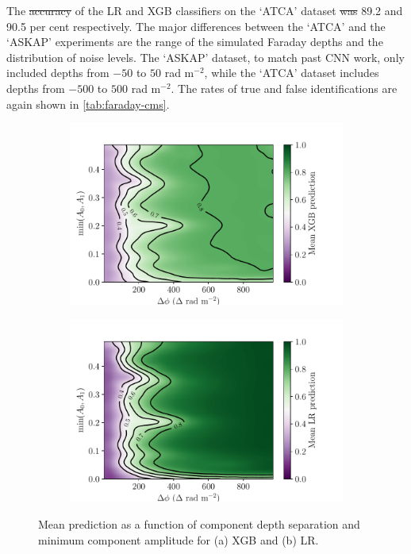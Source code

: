 \documentclass[11pt, a4paper]{book}
\providecommand{\DIFaddtex}[1]{{\protect\color{blue}\uwave{#1}}} %
\providecommand{\DIFdeltex}[1]{{\protect\color{red}\sout{#1}}}                      %
\providecommand{\DIFaddbegin}{} %
\providecommand{\DIFaddend}{} %
\providecommand{\DIFdelbegin}{} %
\providecommand{\DIFdelend}{} %
\providecommand{\DIFadd}[1]{\texorpdfstring{\DIFaddtex{#1}}{#1}} %
\providecommand{\DIFdel}[1]{\texorpdfstring{\DIFdeltex{#1}}{}} %
\newcommand{\DIFscaledelfig}{0.5}
\newlength{\DIFdelgraphicswidth} %
\newlength{\DIFdelgraphicsheight} %
\newcommand{\DIFaddincludegraphics}[2][]{{\color{blue}\fbox{\DIFOincludegraphics[#1]{#2}}}} %
\newcommand{\DIFdelincludegraphics}[2][]{%
\sbox{\DIFdelgraphicsbox}{\DIFOincludegraphics[#1]{#2}}%
\settoboxwidth{\DIFdelgraphicswidth}{\DIFdelgraphicsbox} %
\settoboxtotalheight{\DIFdelgraphicsheight}{\DIFdelgraphicsbox} %
\scalebox{\DIFscaledelfig}{%
\parbox[b]{\DIFdelgraphicswidth}{\usebox{\DIFdelgraphicsbox}\\[-\baselineskip] \rule{\DIFdelgraphicswidth}{0em}}\llap{\resizebox{\DIFdelgraphicswidth}{\DIFdelgraphicsheight}{%
\setlength{\unitlength}{\DIFdelgraphicswidth}%
\begin{picture}(1,1)%
\thicklines\linethickness{2pt} %
{\color[rgb]{1,0,0}\put(0,0){\framebox(1,1){}}}%
{\color[rgb]{1,0,0}\put(0,0){\line( 1,1){1}}}%
{\color[rgb]{1,0,0}\put(0,1){\line(1,-1){1}}}%
\end{picture}%
}\hspace*{3pt}}} %
} %
\DeclareRobustCommand{\DIFaddbegin}{\DIFOaddbegin \let\includegraphics\DIFaddincludegraphics} %
\DeclareRobustCommand{\DIFaddend}{\DIFOaddend \let\includegraphics\DIFOincludegraphics} %
\DeclareRobustCommand{\DIFdelbegin}{\DIFOdelbegin \let\includegraphics\DIFdelincludegraphics} %
\DeclareRobustCommand{\DIFdelend}{\DIFOaddend \let\includegraphics\DIFOincludegraphics} %
\begin{document}
    The \DIFdelbegin \DIFdel{accuracy }\DIFdelend \DIFaddbegin \DIFadd{accuracies }\DIFaddend of the LR and XGB classifiers on the `ATCA' dataset \DIFdelbegin \DIFdel{was }\DIFdelend \DIFaddbegin \DIFadd{were }\DIFaddend 89.2 and 90.5 per cent respectively. The major differences between the `ATCA' and the `ASKAP' experiments are the range of the simulated Faraday depths and the distribution of noise levels. The `ASKAP' dataset, to match past CNN work, only included depths from $-50$ to $50$ rad m$^{-2}$, while the `ATCA' dataset includes depths from $-500$ to $500$ rad m$^{-2}$. The rates of true and false identifications are again shown in \autoref{tab:faraday-cms}.

    \begin{figure}
      \begin{subfigure}{\linewidth}
        \includegraphics[width=\linewidth]{faraday-images/mean_xgb_prediction_dphi_amp.pdf}
        \caption{\label{fig:faraday-mean-xgb-pred}}
      \end{subfigure}
      \begin{subfigure}{\linewidth}
        \includegraphics[width=\linewidth]{faraday-images/mean_lr_prediction_dphi_amp.pdf}
        \caption{\label{fig:faraday-mean-lr-pred}}
      \end{subfigure}
      \caption[Mean prediction as a function of component depth separation and minimum component amplitude for XGB and LR.]{\label{fig:faraday-amps-dphi-mean} Mean prediction as a function of component depth separation and minimum component amplitude for (a) XGB and (b) LR.}
    \end{figure}
\end{document}
